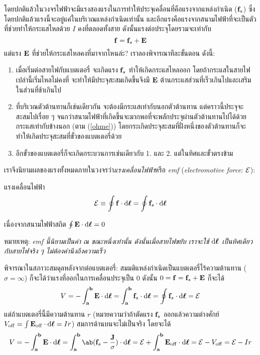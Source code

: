 โดยปกติแล้วในวงจรไฟฟ้าจะมีแรงสองแรงในการทำให้ประจุเคลื่อนที่คือแรงจากแหล่งกำเนิด ($\mathbf{f}_s$) ซึ่งโดยปกติแล้วแรงนี้จะอยู่แค่ในบริเวณแหล่งกำเนิดเท่านั้น และอีกแรงคือแรงจากสนามไฟฟ้าที่จะเป็นตัวที่ช่วยทำให้กระแสไหลด้วย $I$ คงที่ตลอดทั้งสาย ดังนั้นแรงต่อประจุโดยรวมจะเท่ากับ
\[ 
\mathbf{f} = \mathbf{f}_s + \mathbf{E} 
\]
แต่แรง $\mathbf{E}$ ที่ช่วยให้กระแสไหลคงที่มาจากไหนล่ะ? เราลองพิจารณาทีละขั้นตอน ดังนี้:
\begin{enumerate} 
    \item เมื่อเริ่มต่อสายไฟกับแบตเตอรี่ จะเกิดแรง $\mathbf{f}_s$ ทำให้เกิดกระแสไหลออก โดยถ้ากระแสในสายไฟเปล่านี้เริ่มไหลไม่คงที่ จะทำให้มีประจุสะสมเกิดขึ้นจึงมี $\mathbf{E}$ ต้านกระแสส่วนที่เร็วเกินไปและเสริมในส่วนที่ช้าเกินไป
    \item ที่บริเวณตัวต้านทานก็เช่นเดียวกัน จะต้องมีกระแสเท่ากับนอกตัวต้านทาน แต่คราวนี้ประจุจะสะสมไปเรื่อย ๆ จนกว่าสนามไฟฟ้าที่เกิดขึ้นจะมากพอที่จะพลักประจุผ่านตัวต้านทานไปได้ด้วยกระแสเท่ากับข้างนอก (ตาม (\ref{ohme})) โดยกระเกิดประจุสะสมที่ฝั่งหนึ่งของตัวต้านทานก็จะทำให้เกิดประจุสะสมที่ขั้วของแบตเตอรี่ด้วย
    \item อีกขั้วของแบตเตอรี่ก็จะเกิดกระบวนการเช่นเดียวกับ 1. และ 2. แต่ในทิศและขั้วตรงข้าม
\end{enumerate}
เราจึงนิยามผลของแรงทั้งหมดภายในวงจรว่า\emph{แรงเคลื่อนไฟฟ้า}หรือ \emph{emf} (\emph{electromotive force}: $\mathcal{E}$):
\begin{defbox}{แรงเคลื่อนไฟฟ้า} 
    \begin{equation} 
        \emf \equiv \oint \vb{f}\cdot\odif{\vbs{\ell}} = \oint \vb{f}_s\cdot\odif{\vbs{\ell}} 
    \end{equation} 
\end{defbox}
เนื่องจากสนามไฟฟ้าสถิต $\oint \vb{E}\cdot\odif{\vbs{\ell}} = 0$

หมายเหตุ: \emph{emf นี้นิยามเป็นค่า ณ ขณะหนึ่งเท่านั้น ดังนั้นเมื่อสายไฟขยับ เราจะใช้ $\odif{\vbs{\ell}}$ เป็นทิศเดียวกับสายไฟจริง ๆ ไม่ต้องคำนึงถึงความเร็ว}

พิจารณาในสภาวะสมดุลหลังจากต่อแบตเตอรี่: สมมติแหล่งกำเนิดเป็นแบตเตอรี่ไร้ความต้านทาน ($\sigma = \infty$) ก็จะได้ว่าแรงที่ออกในการเคลื่อนประจุเป็น $0$ ดังนั้น $0 = \mathbf{f} = \mathbf{f}_s + \mathbf{E}$ ก็จะได้
\begin{equation} 
    V = -\int_{\vb{a}}^{\vb{b}} \vb{E}\cdot\odif{\vbs{\ell}} = \int_{\vb{a}}^{\vb{b}} \vb{f}_s\cdot\odif{\vbs{\ell}} = \oint \vb{f}_s\cdot\odif{\vbs{\ell}} = \emf 
\end{equation}
แต่ถ้าแบตเตอรี่นี้มีความต้านทาน $r$ (หมายความว่าถ้าตัดแรง $\mathbf{f}_s$ ออกแล้วความต่างศักย์ $V_\txt{off} = \int\vb{E}_\txt{off}\cdot\odif{\vbs{\ell}} = Ir$) สมการด้านบนจะไม่เป็นจริง โดยจะได้
\begin{equation} 
    V = -\int_{\vb{a}}^{\vb{b}} \vb{E}\cdot\odif{\vbs{\ell}} = \int_{\vb{a}}^{\vb{b}} \ab(\vb{f}_s - \frac{\vb{J}}{\sigma})\cdot\odif{\vbs{\ell}} = \emf + \int_{\vb{a}}^{\vb{b}} \vb{E}_\txt{off}\cdot\odif{\vbs{\ell}} = \emf - V_\txt{off} = \emf - Ir 
\end{equation}

